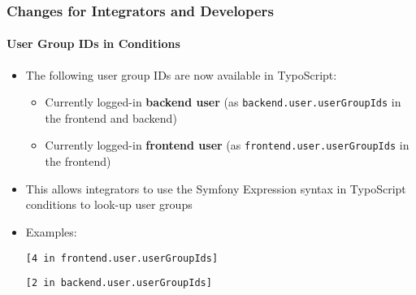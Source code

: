 %

\begin{frame}[fragile]
	\frametitle{Changes for Integrators and Developers}
	\framesubtitle{User Group IDs in Conditions}


	\begin{itemize}
		\item The following user group IDs are now available in TypoScript:

		\begin{itemize}
			\item Currently logged-in \textbf{backend user}\newline
				(as \texttt{backend.user.userGroupIds} in the frontend and backend)
			\item Currently logged-in \textbf{frontend user}\newline
				(as \texttt{frontend.user.userGroupIds} in the frontend)
		\end{itemize}

		\item This allows integrators to use the Symfony Expression syntax in
			TypoScript conditions to look-up user groups
		\item Examples:
\begin{lstlisting}
[4 in frontend.user.userGroupIds]
\end{lstlisting}
\vspace{-0.2cm}
\begin{lstlisting}
[2 in backend.user.userGroupIds]
\end{lstlisting}
	\end{itemize}

\end{frame}

